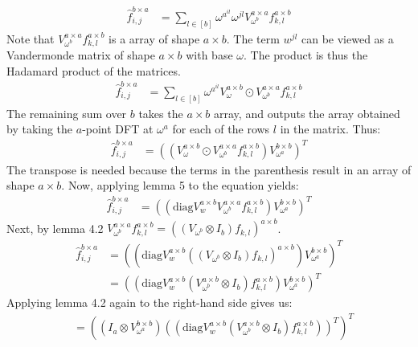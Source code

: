 \documentclass[11pt,a4paper]{article}
\begin{document}
\begin{enumerate}
          \begin{align*}
              \hat{f}_{i, j}^{b \times a} & = \sum_{l \in [b]} \omega^{a^{il}}\omega^{jl} V_{\omega^b}^{a \times a} f_{k, l}^{a \times b}
          \end{align*}
          Note that $V_{\omega^b}^{a \times a} f_{k, l}^{a \times b}$ is a array of shape $a \times b$. The term $w^{jl}$ can be viewed as a
          Vandermonde matrix of shape $a \times b$ with base $\omega$. The product is thus the Hadamard product of the matrices.
          \begin{align*}
              \hat{f}_{i, j}^{b \times a} & = \sum_{l \in [b]} \omega^{a^{il}} V_\omega^{a \times b} \odot V_{\omega^b}^{a \times a} f_{k, l}^{a \times b}
          \end{align*}
          The remaining sum over $b$ takes the $a \times b$ array, and outputs the array obtained by taking the $a$-point DFT at $\omega^a$
          for each of the rows $l$ in the matrix. Thus:
          \begin{align*}
              \hat{f}_{i, j}^{b \times a} & = ((V_\omega^{a \times b} \odot V_{\omega^b}^{a \times a} f_{k, l}^{a \times b})V_{\omega^a}^{b \times b})^T
          \end{align*}
          The transpose is needed because the terms in the parenthesis result in an array of shape $a \times b$.
          Now, applying lemma 5 to the equation yields:
          \begin{align*}
              \hat{f}_{i, j}^{b \times a} & = ((\text{diag} V_w^{a \times b} V_{\omega^b}^{a \times a} f_{k, l}^{a \times b})V_{\omega^a}^{b \times b})^T
          \end{align*}
          Next, by lemma 4.2 $V_{\omega^b}^{a \times a} f_{k, l}^{a \times b} = ((V_{\omega^b} \otimes I_b)f_{k, l})^{a \times b}$.
          \begin{align*}
              \hat{f}_{i, j}^{b \times a} & = ((\text{diag} V_w^{a \times b} ((V_{\omega^b}\otimes I_b) f_{k, l})^{a \times b})V_{\omega^a}^{b \times b})^T             \\
                                          & = ((\text{diag} V_w^{a \times b} (V_{\omega^b}^{a \times b} \otimes I_b) f_{k, l}^{a \times b})V_{\omega^a}^{b \times b})^T
          \end{align*}
          Applying lemma 4.2 again to the right-hand side gives us:
          \begin{align*}
               & = ((I_a \otimes V_{\omega^a}^{b \times b})((\text{diag} V_w^{a \times b} (V_{\omega^b}^{a \times b} \otimes I_b) f_{k, l}^{a \times b}))^T)^T \\

\end{align*}
\end{enumerate}
\end{document}

